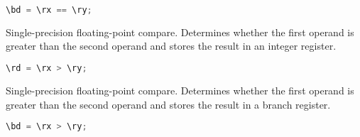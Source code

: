 \begin{lstlisting}[numbers=none, basicstyle=\ttfamily\footnotesize, language=C++]
\bd = \rx == \ry;
\end{lstlisting}

Single-precision floating-point compare. Determines whether the first operand is greater than the second operand and stores
the result in an integer register.

\begin{lstlisting}[numbers=none, basicstyle=\ttfamily\footnotesize, language=C++]
\rd = \rx > \ry;
\end{lstlisting}

Single-precision floating-point compare. Determines whether the first operand is greater than the second operand and stores
the result in a branch register.

\begin{lstlisting}[numbers=none, basicstyle=\ttfamily\footnotesize, language=C++]
\bd = \rx > \ry;
\end{lstlisting}

%

%

